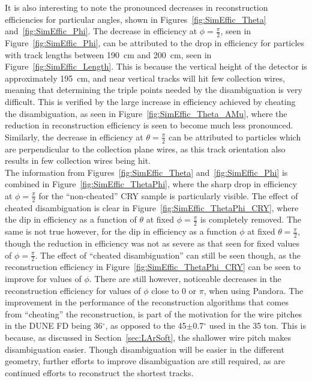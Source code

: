 It is also interesting to note the pronounced decreases in reconstruction efficiencies for particular angles, shown in Figures~\ref{fig:SimEffic_Theta} and~\ref{fig:SimEffic_Phi}. The decrease in efficiency at $\phi = \frac{\pi}{2}$, seen in Figure~\ref{fig:SimEffic_Phi}, can be attributed to the drop in efficiency for particles with track lengths between 190~cm and 200~cm, seen in Figure~\ref{fig:SimEffic_Length}. This is because the vertical height of the detector is approximately 195~cm, and near vertical tracks will hit few collection wires, meaning that determining the triple points needed by the disambiguation is very difficult. This is verified by the large increase in efficiency achieved by cheating the disambiguation, as seen in Figure~\ref{fig:SimEffic_Theta_AMu}, where the reduction in reconstruction efficiency is seen to become much less pronounced. Similarly, the decrease in efficiency at $\theta = \frac{\pi}{2}$ can be attributed to particles which are perpendicular to the collection plane wires, as this track orientation also results in few collection wires being hit. \\  

The information from Figures~\ref{fig:SimEffic_Theta} and~\ref{fig:SimEffic_Phi} is combined in Figure~\ref{fig:SimEffic_ThetaPhi}, where the sharp drop in efficiency at $\phi = \frac{\pi}{2}$ for the ``non-cheated'' CRY sample is particularly visible. The effect of cheated disambiguation is clear in Figure~\ref{fig:SimEffic_ThetaPhi_CRY}, where the dip in efficiency as a function of $\theta$ at fixed $\phi=\frac{\pi}{2}$ is completely removed. The same is not true however, for the dip in efficiency as a function $\phi$ at fixed $\theta = \frac{\pi}{2}$, though the reduction in efficiency was not as severe as that seen for fixed values of $\phi = \frac{\pi}{2}$. The effect of ``cheated disambiguation'' can still be seen though, as the reconstruction efficiency in Figure~\ref{fig:SimEffic_ThetaPhi_CRY} can be seen to improve for values of $\phi$. There are still however, noticeable decreases in the reconstruction efficiency for values of $\phi$ close to 0 or $\pi$, when using Pandora. The improvement in the performance of the reconstruction algorithms that comes from ``cheating'' the reconstruction, is part of the motivation for the wire pitches in the DUNE FD being 36$^{\circ}$, as opposed to the 45$\pm$0.7$^{\circ}$ used in the 35 ton. This is because, as discussed in Section~\ref{sec:LArSoft}, the shallower wire pitch makes disambiguation easier. Though disambiguation will be easier in the different geometry, further efforts to improve disambiguation are still required, as are continued efforts to reconstruct the shortest tracks. \\

